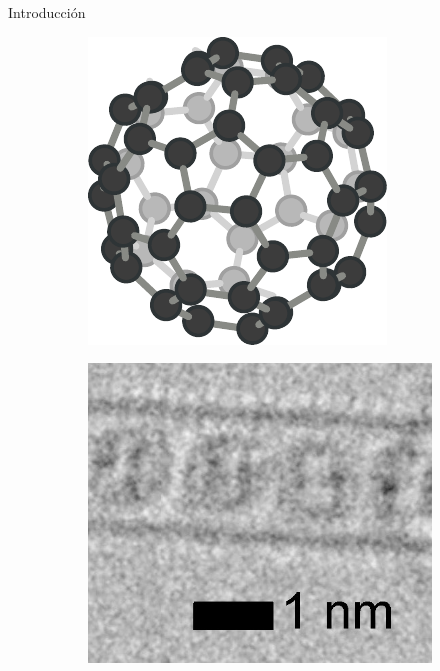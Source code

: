 \documentclass[aspectratio=169]{beamer}
\begin{document}
\begin{frame}{Introducción}
\begin{figure}
\begin{subfigure}[b]{0.15\textwidth}
				\includegraphics[width=\textwidth]{fullerene_structure.pdf}
				\caption{}
				\label{fig:fullerene_structure}
			\end{subfigure}
			\begin{subfigure}[b]{0.15\textwidth}
				\includegraphics[width=\textwidth]{fullerene_image.jpg}

\end{subfigure}
\end{figure}
\end{frame}
\end{document}
